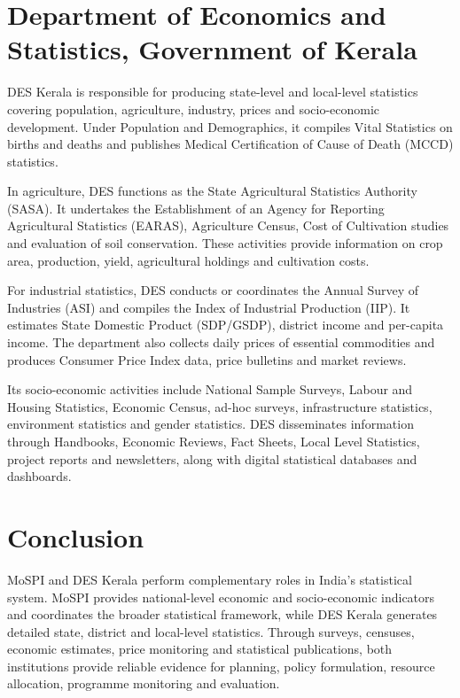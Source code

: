 \documentclass[12pt,a4paper]{article}
\begin{document}
\section{Department of Economics and Statistics, Government of Kerala}

DES Kerala is responsible for producing state-level and local-level statistics covering population, agriculture, industry, prices and socio-economic development. Under Population and Demographics, it compiles Vital Statistics on births and deaths and publishes Medical Certification of Cause of Death (MCCD) statistics.

In agriculture, DES functions as the State Agricultural Statistics Authority (SASA). It undertakes the Establishment of an Agency for Reporting Agricultural Statistics (EARAS), Agriculture Census, Cost of Cultivation studies and evaluation of soil conservation. These activities provide information on crop area, production, yield, agricultural holdings and cultivation costs.

For industrial statistics, DES conducts or coordinates the Annual Survey of Industries (ASI) and compiles the Index of Industrial Production (IIP). It estimates State Domestic Product (SDP/GSDP), district income and per-capita income. The department also collects daily prices of essential commodities and produces Consumer Price Index data, price bulletins and market reviews.

Its socio-economic activities include National Sample Surveys, Labour and Housing Statistics, Economic Census, ad-hoc surveys, infrastructure statistics, environment statistics and gender statistics. DES disseminates information through Handbooks, Economic Reviews, Fact Sheets, Local Level Statistics, project reports and newsletters, along with digital statistical databases and dashboards.

\section{Conclusion}

MoSPI and DES Kerala perform complementary roles in India's statistical system. MoSPI provides national-level economic and socio-economic indicators and coordinates the broader statistical framework, while DES Kerala generates detailed state, district and local-level statistics. Through surveys, censuses, economic estimates, price monitoring and statistical publications, both institutions provide reliable evidence for planning, policy formulation, resource allocation, programme monitoring and evaluation.
\end{document}
